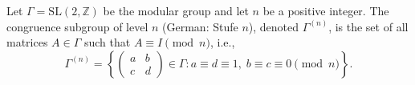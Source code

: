 Let $\Gamma = \text{SL}(2, \mathbb{Z})$ be the modular group and let $n$ be a positive integer. The congruence subgroup of level $n$ (German: Stufe $n$), denoted $\Gamma^{(n)}$, is the set of all matrices $A \in \Gamma$ such that $A \equiv I \pmod{n}$, i.e.,
$$\Gamma^{(n)} = \left\{ \begin{pmatrix} a & b \\ c & d \end{pmatrix} \in \Gamma : a \equiv d \equiv 1,\; b \equiv c \equiv 0 \pmod{n} \right\}.$$
